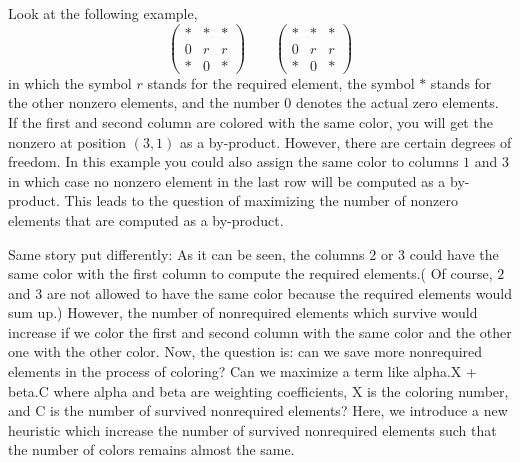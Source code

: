 \documentclass[12pt, oneside]{book}
\begin{document}
Look at the following example,
\begin{equation}
\left(\begin{array}{rrb}
* & * & *\\
0 & r & r \\
* & 0 & *
\end{array}\right)
\qquad
\left(\begin{array}{rbr}
* & * & *\\
0 & r & r \\
* & 0 & *
\end{array}\right)
\label{twocolorings}
\end{equation}
in which the symbol $r$ stands for the required element, the symbol \textit{$*$}
stands for the other nonzero elements, and the number $0$ denotes the
actual zero elements. If the first and second column are colored
with the same color, you will get the nonzero at position $(3,1)$ as
a by-product. However, there are certain degrees of freedom. In
this example you could also assign the same color to columns $1$ and
$3$ in which case no nonzero element in the last row will be computed
as a by-product. This leads to the question of maximizing the
number of nonzero elements that are computed as a by-product.

Same story put differently: As it can be seen, the columns $2$ or $3$
could have the same color with the first column to compute the
required elements.( Of course, $2$ and $3$ are not allowed to have the
same color because the required elements would sum up.) However,
the number of nonrequired elements which survive would increase if
we color the first and second column with the same color and the
other one with the other color. Now, the question is: can we save
more nonrequired elements in the process of coloring? Can we
maximize a term like alpha.X + beta.C where alpha and beta are
weighting coefficients, X is the coloring number, and C is the
number of survived nonrequired elements?
Here, we introduce a new heuristic which increase the number of survived nonrequired elements
such that the number of colors remains almost the same.
\end{document}
